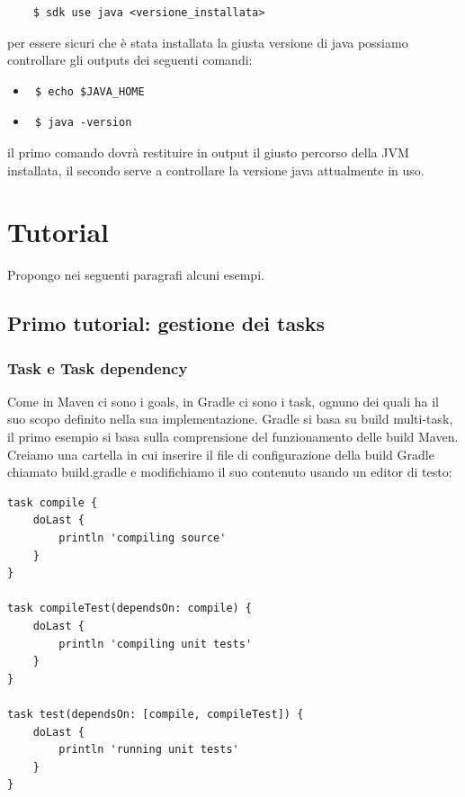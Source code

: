 \documentclass{article}
\begin{document}
\begin{flushleft}
\begin{verbatim}
    $ sdk use java <versione_installata> \end{verbatim} 
per essere sicuri che è stata installata la giusta versione di java possiamo controllare gli outputs dei seguenti comandi:
\begin{itemize}
  \item 
  \begin{verbatim} $ echo $JAVA_HOME \end{verbatim}
  \item \begin{verbatim} $ java -version \end{verbatim}
\end{itemize}
il primo comando dovrà restituire in output il giusto percorso della JVM installata, il secondo serve a controllare la versione java attualmente in uso.


\section{Tutorial} %
Propongo nei seguenti paragrafi alcuni esempi.

\subsection{Primo tutorial: gestione dei tasks}

\subsubsection{Task e Task dependency}
Come in Maven ci sono i goals, in Gradle ci sono i task, ognuno dei quali ha il suo scopo definito nella sua implementazione. Gradle si basa su build multi-task, il primo esempio si basa sulla comprensione del funzionamento delle build Maven. Creiamo una cartella in cui inserire il file di configurazione della build Gradle chiamato build.gradle e modifichiamo il suo contenuto usando un editor di testo:
\begin{verbatim}
task compile {
    doLast {
        println 'compiling source'
    }
}

task compileTest(dependsOn: compile) {
    doLast {
        println 'compiling unit tests'
    }
}

task test(dependsOn: [compile, compileTest]) {
    doLast {
        println 'running unit tests'
    }
}


\end{verbatim}
\end{flushleft}
\end{document}
